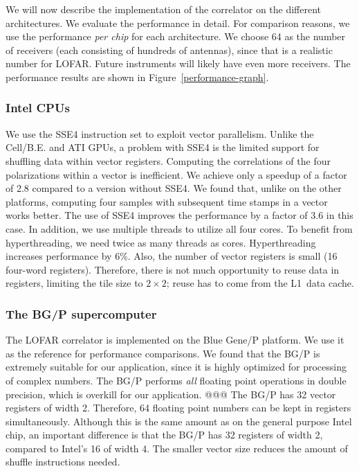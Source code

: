 \documentclass{article}
\begin{document}
We will now describe the implementation of the correlator on
the different architectures. 
We evaluate the performance in detail. For comparison reasons, we use the performance
\emph{per chip} for each architecture.
We choose 64 as the number of receivers (each consisting of hundreds of antennas), since
that is a realistic number for LOFAR.  Future instruments will likely
have even more receivers. The performance results are shown in Figure~\ref{performance-graph}.

\subsubsection{Intel CPUs}

We use the SSE4 instruction set to exploit vector parallelism.  
Unlike the Cell/B.E. and ATI GPUs, a
problem with SSE4 is the limited support for shuffling data within
vector registers.  Computing the
correlations of the four polarizations within a vector is
inefficient. We achieve only a speedup of a factor of 2.8 compared to
a version without SSE4.  We found that, unlike on the other platforms,
computing four samples with subsequent time stamps in a vector works
better.  The use of SSE4 improves the performance by a factor of 3.6
in this case.  In addition, we use multiple threads to utilize all
four cores.  To benefit from hyperthreading, we need twice as many
threads as cores.  Hyperthreading increases performance by 6\%.  Also,
the number of vector registers is small (16 four-word registers).
Therefore, there is not much opportunity to reuse data in registers,
limiting the tile size to $2 \times 2$; reuse has to come from the
L1~data cache.



\subsubsection{The BG/P supercomputer}

The LOFAR correlator is implemented on the Blue Gene/P platform.
We use it as the reference for performance comparisons.
We found that the BG/P is extremely suitable for our application,
since it is highly optimized for processing of complex numbers.
The BG/P performs \emph{all} floating point operations in double
precision, which is overkill for our application.
@@@
The BG/P has 32 vector registers of width 2.  Therefore, 64 floating
point numbers can be kept in registers
simultaneously. Although this is the same amount as on the general purpose
Intel chip, an important difference is that the BG/P has 32
registers of width 2, compared to Intel's 16 of width 4.  The smaller
vector size reduces the amount of shuffle instructions needed.
\end{document}
